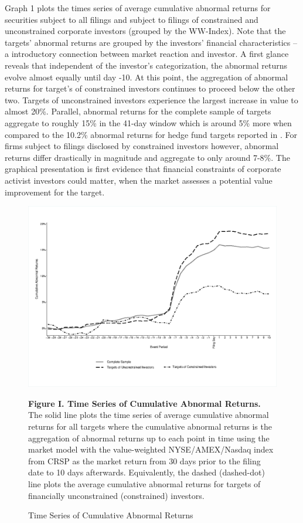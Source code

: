 \documentclass[12pt]{article}
\begin{document}
Graph 1 plots the times series of average cumulative abnormal returns for securities subject to all filings and subject to filings of constrained and unconstrained corporate investors (grouped by the WW-Index). Note that the targets' abnormal returns are grouped by the investors' financial characteristics -- a introductory connection between market reaction and investor. A first glance reveals that independent of the investor's categorization, the abnormal returns evolve almost equally until day -10. At this point, the aggregation of  abnormal returns for target's of constrained investors continues to proceed below the other two. Targets of unconstrained investors experience the largest increase in value to almost 20\%. Parallel, abnormal returns for the complete sample of targets aggregate to roughly 15\% in the 41-day window which is around 5\% more when compared to the 10.2\% abnormal returns for hedge fund targets reported in \citet[p.208]{Klein2009}. 
For firms subject to filings disclosed by constrained investors however, abnormal returns differ drastically in magnitude and aggregate to only around 7-8\%. The graphical presentation is first evidence that financial constraints of corporate activist investors could matter, when the market assesses a potential value improvement for the target.


\begin{figure}[!htb]
	\centering
	\captionsetup{textformat=empty,labelformat=blank}
	\caption{Time Series of Cumulative Abnormal Returns}
	\begin{adjustbox}{width=\textwidth}
		\includegraphics{WW-TimeS_copy.eps} \label{AR}
	\end{adjustbox}
	\justifying
	\noindent\footnotesize{}\textbf{Figure I. Time Series of Cumulative Abnormal Returns.} The solid line plots the time series of average cumulative abnormal returns for all targets where the cumulative abnormal returns is the aggregation of abnormal returns up to each point in time using the market model with the value-weighted NYSE/AMEX/Nasdaq index from CRSP as the market return from 30 days prior to the filing date to 10 days afterwards. Equivalently, the dashed (dashed-dot) line plots the average cumulative abnormal returns for targets of financially unconstrained (constrained) investors. \par\medskip
\end{figure}
\end{document}
